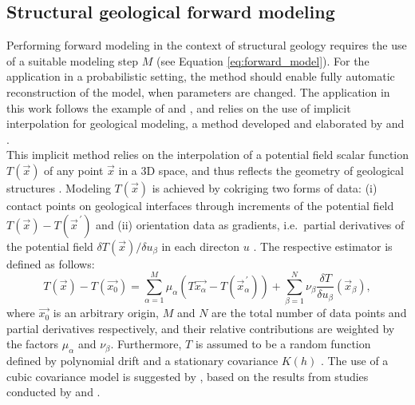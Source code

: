         \subsection{Structural geological forward modeling}\label{sec:struc_geo_modeling}       
        Performing forward modeling in the context of structural geology requires the use of a suitable modeling step $M$ (see Equation \ref{eq:forward_model}). For the application in a probabilistic setting, the method should enable fully automatic reconstruction of the model, when parameters are changed. The application in this work follows the example of \citet{wellmann2010towards} and \citet{delaVarga2016}, and relies on the use of implicit interpolation for geological modeling, a method developed and elaborated by \citet{lajaunie1997foliation} and \citet{calcagno2008geological}.\\
        This implicit method relies on the interpolation of a potential field scalar function $T(\vec{x})$ of any point $\vec{x}$ in a 3D space, and thus reflects the geometry of geological structures \citep{calcagno2008geological}. Modeling $T(\vec{x})$ is achieved by cokriging two forms of data: (i) contact points on geological interfaces through increments of the potential field $T(\vec{x})-T(\vec{x}^{\,'})$ and (ii) orientation data as gradients, i.e.\ partial derivatives of the potential field $\delta T(\vec{x})/\delta u_\beta$ in each directon $u$ \citep{calcagno2008geological}. The respective estimator is defined as follows:
        \begin{equation}\label{eq:Cokriging_Estimator}
                T(\vec{x})-T(\vec{x_0})=\sum_{\alpha=1}^{M}\mu_\alpha(T\vec{x_\alpha}-T(\vec{x}^{\,'}_\alpha))+\sum_{\beta=1}^{N}\nu_\beta\frac{\delta T}{\delta u_\beta}(\vec{x}_\beta),
        \end{equation}        
        where $\vec{x_0}$ is an arbitrary origin, $M$ and $N$ are the total number of data points and partial derivatives respectively, and their relative contributions are weighted by the factors $\mu_\alpha$ and $\nu_\beta$. Furthermore, $T$ is assumed to be a random function defined by polynomial drift and a stationary covariance $K(h)$ \citep{calcagno2008geological}. The use of a cubic covariance model is suggested by \citet{calcagno2008geological}, based on the results from studies conducted by \citet{aug2004modelisation} and \citet{chiles2004modelling}.
